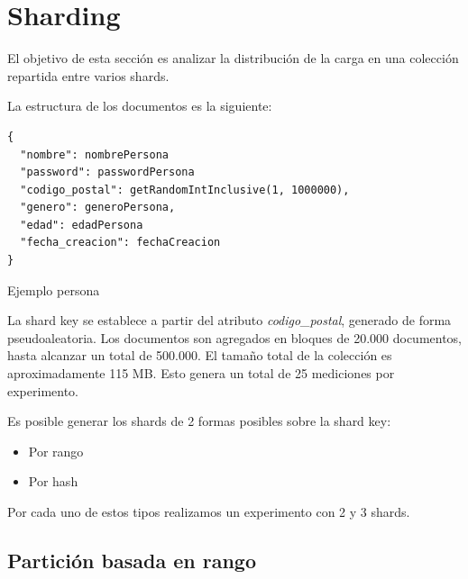 \section{Sharding}

El objetivo de esta sección es analizar la distribución de la carga en una colección repartida entre varios shards.

La estructura de los documentos es la siguiente:

\begin{listing}
\begin{verbatim}
{
  "nombre": nombrePersona
  "password": passwordPersona
  "codigo_postal": getRandomIntInclusive(1, 1000000),
  "genero": generoPersona,
  "edad": edadPersona
  "fecha_creacion": fechaCreacion
}

\end{verbatim}
\caption{Ejemplo persona}
\label{json-example}
\end{listing}

La shard key se establece a partir del atributo \emph{codigo\_postal}, generado de forma pseudoaleatoria.
Los documentos son agregados en bloques de 20.000 documentos, hasta alcanzar un total de 500.000. El tamaño
total de la colección es aproximadamente 115 MB. Esto genera un total de 25 mediciones por experimento.

Es posible generar los shards de 2 formas posibles sobre la shard key:
\begin{itemize}
\item Por rango
\item Por hash
\end{itemize}

Por cada uno de estos tipos realizamos un experimento con 2 y 3 shards.

\subsection{Partición basada en rango}

